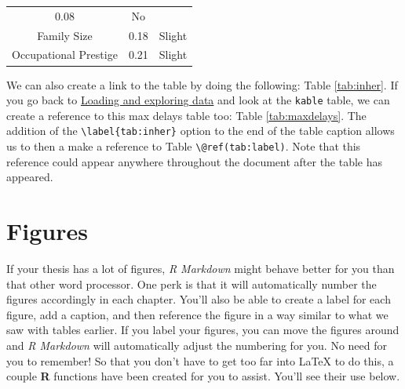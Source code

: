 \documentclass[12pt,twoside]{reedthesis}
\begin{document}
\begin{longtable}[c]{@{}ccc@{}}
\begin{minipage}[t]{0.47\columnwidth}
  0.08
  \strut\end{minipage} &
  \begin{minipage}[t]{0.16\columnwidth}\centering\strut
  No
  \strut\end{minipage}\tabularnewline
  \begin{minipage}[t]{0.29\columnwidth}\centering\strut
  Family Size
  \strut\end{minipage} &
  \begin{minipage}[t]{0.47\columnwidth}\centering\strut
  0.18
  \strut\end{minipage} &
  \begin{minipage}[t]{0.16\columnwidth}\centering\strut
  Slight
  \strut\end{minipage}\tabularnewline
  \begin{minipage}[t]{0.29\columnwidth}\centering\strut
  Occupational Prestige
  \strut\end{minipage} &
  \begin{minipage}[t]{0.47\columnwidth}\centering\strut
  0.21
  \strut\end{minipage} &
  \begin{minipage}[t]{0.16\columnwidth}\centering\strut
  Slight
  \strut\end{minipage}\tabularnewline
  \bottomrule
  \end{longtable}
  
  We can also create a link to the table by doing the following: Table
  \ref{tab:inher}. If you go back to
  \protect\hyperlink{loading-and-exploring-data}{Loading and exploring
  data} and look at the \texttt{kable} table, we can create a reference to
  this max delays table too: Table \ref{tab:maxdelays}. The addition of
  the \texttt{\textbackslash{}label\{tab:inher\}} option to the end of the
  table caption allows us to then a make a reference to Table
  \texttt{\textbackslash{}@ref(tab:label)}. Note that this reference could
  appear anywhere throughout the document after the table has appeared.
  
  \clearpage
  
  \section{Figures}\label{figures}
  
  If your thesis has a lot of figures, \emph{R Markdown} might behave
  better for you than that other word processor. One perk is that it will
  automatically number the figures accordingly in each chapter. You'll
  also be able to create a label for each figure, add a caption, and then
  reference the figure in a way similar to what we saw with tables
  earlier. If you label your figures, you can move the figures around and
  \emph{R Markdown} will automatically adjust the numbering for you. No
  need for you to remember! So that you don't have to get too far into
  LaTeX to do this, a couple \textbf{R} functions have been created for
  you to assist. You'll see their use below.
  
\end{document}
